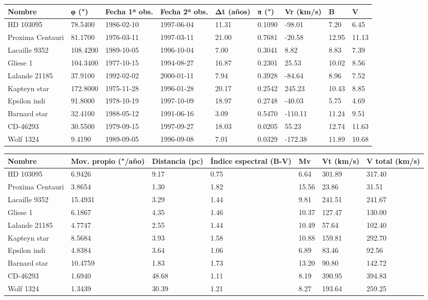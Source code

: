 \begin{tabular}{lllllllll}
\toprule
Nombre & φ (") & Fecha 1ª obs. & Fecha 2ª obs. & Δt (años) & π (") & Vr (km/s) & B & V \\
\midrule
HD 103095 & 78.5400 & 1986-02-10 & 1997-06-04 & 11.31 & 0.1090 & -98.01 & 7.20 & 6.45 \\
Proxima Centauri & 81.1700 & 1976-03-11 & 1997-03-11 & 21.00 & 0.7681 & -20.58 & 12.95 & 11.13 \\
Lacaille 9352 & 108.4200 & 1989-10-05 & 1996-10-04 & 7.00 & 0.3041 & 8.82 & 8.83 & 7.39 \\
Gliese 1 & 104.3400 & 1977-10-15 & 1994-08-27 & 16.87 & 0.2301 & 25.53 & 10.02 & 8.56 \\
Lalande 21185 & 37.9100 & 1992-02-02 & 2000-01-11 & 7.94 & 0.3928 & -84.64 & 8.96 & 7.52 \\
Kapteyn star & 172.8000 & 1975-11-28 & 1996-01-28 & 20.17 & 0.2542 & 245.23 & 10.43 & 8.85 \\
Epsilon indi & 91.8000 & 1978-10-19 & 1997-10-09 & 18.97 & 0.2748 & -40.03 & 5.75 & 4.69 \\
Barnard star & 32.4100 & 1988-05-12 & 1991-06-16 & 3.09 & 0.5470 & -110.11 & 11.24 & 9.51 \\
CD-46293 & 30.5500 & 1979-09-15 & 1997-09-27 & 18.03 & 0.0205 & 55.23 & 12.74 & 11.63 \\
Wolf 1324 & 9.4190 & 1989-09-05 & 1996-09-08 & 7.01 & 0.0329 & -172.38 & 11.89 & 10.68 \\
\bottomrule
\end{tabular}


\begin{tabular}{lllllll}
\toprule
Nombre & Mov. propio ("/año) & Distancia (pc) & Índice espectral (B-V) & Mv & Vt (km/s) & V total (km/s) \\
\midrule
HD 103095 & 6.9426 & 9.17 & 0.75 & 6.64 & 301.89 & 317.40 \\
Proxima Centauri & 3.8654 & 1.30 & 1.82 & 15.56 & 23.86 & 31.51 \\
Lacaille 9352 & 15.4931 & 3.29 & 1.44 & 9.81 & 241.51 & 241.67 \\
Gliese 1 & 6.1867 & 4.35 & 1.46 & 10.37 & 127.47 & 130.00 \\
Lalande 21185 & 4.7747 & 2.55 & 1.44 & 10.49 & 57.64 & 102.40 \\
Kapteyn star & 8.5684 & 3.93 & 1.58 & 10.88 & 159.81 & 292.70 \\
Epsilon indi & 4.8384 & 3.64 & 1.06 & 6.89 & 83.46 & 92.56 \\
Barnard star & 10.4759 & 1.83 & 1.73 & 13.20 & 90.80 & 142.72 \\
CD-46293 & 1.6940 & 48.68 & 1.11 & 8.19 & 390.95 & 394.83 \\
Wolf 1324 & 1.3439 & 30.39 & 1.21 & 8.27 & 193.64 & 259.25 \\
\bottomrule
\end{tabular}
